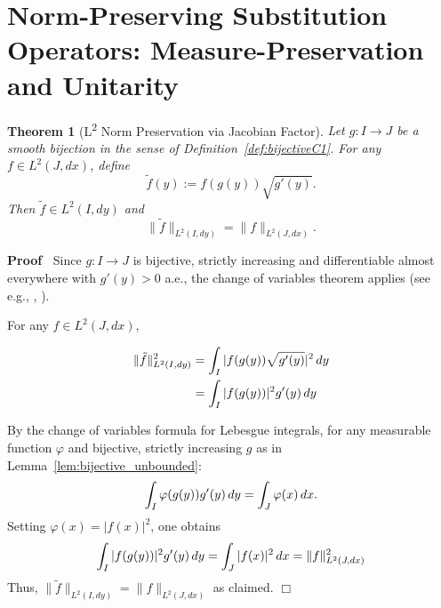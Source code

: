 \documentclass{article}
\newcommand{\assign}{:=}
\newcommand{\tmrsup}[1]{\textsuperscript{#1}}
\newenvironment{proof}{\noindent\textbf{Proof\ }}{\hspace*{\fill}$\Box$\medskip}
\newtheorem{theorem}{Theorem}
\begin{document}
\section{Norm-Preserving Substitution Operators: Measure-Preservation and
Unitarity}

\begin{theorem}
  [L\tmrsup{2} Norm Preservation via Jacobian Factor]\label{thm:L2_jacobian}
  Let $g : I \to J$ be a smooth bijection in the sense of
  Definition~\ref{def:bijectiveC1}. For any $f \in L^2 (J, dx)$, define
  \begin{equation}
    \label{eq:transformationdef} \tilde{f} (y) \assign f (g (y)) \sqrt{g' (y)}
    .
  \end{equation}
  Then $\tilde{f} \in L^2 (I, dy)$ and
  \begin{equation}
    \label{eq:L2normpres} \| \tilde{f} \|_{L^2 (I, dy)} = \|f\|_{L^2 (J, dx)}
    .
  \end{equation}
\end{theorem}

\begin{proof}
  Since $g : I \to J$ is bijective, strictly increasing and differentiable
  almost everywhere with $g' (y) > 0$ a.e., the change of variables theorem
  applies (see e.g., {\cite{RoydenFitzpatrick}}, {\cite{Folland}}).
  
  For any $f \in L^2 (J, dx)$,
  
  \begin{align}
    \| \tilde{f} \|_{L^2 (I, dy)}^2 & = \int_I |f (g (y)) \sqrt{g' (y)} |^2 
    \hspace{0.17em} dy  \label{eq:normexpansion1}\\
    & = \int_I |f (g (y)) |^2 g' (y)  \hspace{0.17em} dy 
    \label{eq:normexpansion2}
  \end{align}
  
  By the change of variables formula for Lebesgue integrals, for any
  measurable function $\varphi$ and bijective, strictly increasing $g$ as in
  Lemma~\ref{lem:bijective_unbounded}:
  \begin{equation}
    \label{eq:cov} \int_I \varphi (g (y)) g' (y)  \hspace{0.17em} dy = \int_J
    \varphi (x)  \hspace{0.17em} dx.
  \end{equation}
  Setting $\varphi (x) = |f (x) |^2$, one obtains
  \begin{equation}
    \int_I |f (g (y)) |^2 g' (y) \hspace{0.17em} dy = \int_J |f (x) |^2 
    \hspace{0.17em} dx = \|f\|_{L^2 (J, dx)}^2 \label{eq:aftercov}
  \end{equation}
  Thus, $\| \tilde{f} \|_{L^2 (I, dy)} = \|f\|_{L^2 (J, dx)}$ as claimed.
\end{proof}
\end{document}

